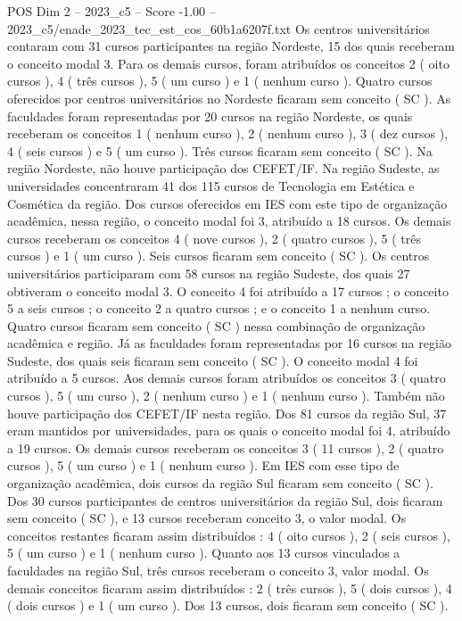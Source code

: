 \begin{textsample}{POS Dim 2 – 2023\_c5 – Score -1.00 – 2023\_c5/enade\_2023\_tec\_est\_cos\_60b1a6207f.txt}
Os centros universitários contaram com 31 cursos participantes na região Nordeste, 15 dos quais receberam o conceito modal 3.
Para os demais cursos, foram atribuídos os conceitos 2 ( oito cursos ), 4 ( três cursos ), 5 ( um curso ) e 1 ( nenhum curso ).
Quatro cursos oferecidos por centros universitários no Nordeste ficaram sem conceito ( SC ).
As faculdades foram representadas por 20 cursos na região Nordeste, os quais receberam os conceitos 1 ( nenhum curso ), 2 ( nenhum curso ), 3 ( dez cursos ), 4 ( seis cursos ) e 5 ( um curso ).
Três cursos ficaram sem conceito ( SC ).
Na região Nordeste, não houve participação dos CEFET/IF.
Na região Sudeste, as universidades concentraram 41 dos 115 cursos de Tecnologia em Estética e Cosmética da região.
Dos cursos oferecidos em IES com este tipo de organização acadêmica, nessa região, o conceito modal foi 3, atribuído a 18 cursos.
Os demais cursos receberam os conceitos 4 ( nove cursos ), 2 ( quatro cursos ), 5 ( três cursos ) e 1 ( um curso ).
Seis cursos ficaram sem conceito ( SC ).
Os centros universitários participaram com 58 cursos na região Sudeste, dos quais 27 obtiveram o conceito modal 3.
O conceito 4 foi atribuído a 17 cursos ; o conceito 5 a seis cursos ; o conceito 2 a quatro cursos ; e o conceito 1 a nenhum curso.
Quatro cursos ficaram sem conceito ( SC ) nessa combinação de organização acadêmica e região.
Já as faculdades foram representadas por 16 cursos na região Sudeste, dos quais seis ficaram sem conceito ( SC ).
O conceito modal 4 foi atribuído a 5 cursos.
Aos demais cursos foram atribuídos os conceitos 3 ( quatro cursos ), 5 ( um curso ), 2 ( nenhum curso ) e 1 ( nenhum curso ).
Também não houve participação dos CEFET/IF nesta região.
Dos 81 cursos da região Sul, 37 eram mantidos por universidades, para os quais o conceito modal foi 4, atribuído a 19 cursos.
Os demais cursos receberam os conceitos 3 ( 11 cursos ), 2 ( quatro cursos ), 5 ( um curso ) e 1 ( nenhum curso ).
Em IES com esse tipo de organização acadêmica, dois cursos da região Sul ficaram sem conceito ( SC ).
Dos 30 cursos participantes de centros universitários da região Sul, dois ficaram sem conceito ( SC ), e 13 cursos receberam conceito 3, o valor modal.
Os conceitos restantes ficaram assim distribuídos : 4 ( oito cursos ), 2 ( seis cursos ), 5 ( um curso ) e 1 ( nenhum curso ).
Quanto aos 13 cursos vinculados a faculdades na região Sul, três cursos receberam o conceito 3, valor modal.
Os demais conceitos ficaram assim distribuídos : 2 ( três cursos ), 5 ( dois cursos ), 4 ( dois cursos ) e 1 ( um curso ).
Dos 13 cursos, dois ficaram sem conceito ( SC ).

\end{textsample}
